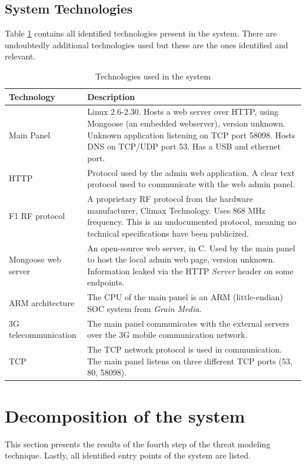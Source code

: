 \subsection{System Technologies}
Table \ref{tb:system-technologies} contains all identified technologies present in the system. There are undoubtedly additional technologies used but these are the ones identified and relevant.
\begin{table}[!p]
    \centering
    \begin{tabularx}{\textwidth}{l X}
        \hline
        \textbf{Technology}  & \textbf{Description}
        \\ \hline
        Main Panel & Linux 2.6-2.30. Hosts a web server over HTTP, using Mongoose (an embedded webserver), version unknown. Unknown application listening on TCP port 58098. Hosts DNS on TCP/UDP port 53. Has a USB and ethernet port.
        \\ \hline
        HTTP  & Protocol used by the admin web application. A clear text protocol used to communicate with the web admin panel.
        \\ \hline
        F1 RF protocol  & A proprietary \gls{RF} protocol from the hardware manufacturer, Climax Technology. Uses 868 MHz frequency. This is an undocumented protocol, meaning no technical specifications have been publicized.
        \\ \hline
        Mongoose web server  & An open-source web server, in C. Used by the main panel to host the local admin web page, version unknown. Information leaked via the HTTP \textit{Server} header on some endpoints.
        \\ \hline
        ARM architecture  & The CPU of the main panel is an ARM (little-endian) SOC system from \textit{Grain Media}.
        \\ \hline
        3G telecommunication  & The main panel communicates with the external servers over the 3G mobile communication network.
        \\ \hline
        TCP  & The \gls{TCP} network protocol is used in communication. The main panel listens on three different TCP ports (53, 80, 58098).
        \\ \hline
    \end{tabularx}
    \caption{Technologies used in the system}
    \label{tb:system-technologies}
\end{table}

\section{Decomposition of the system}
This section presents the results of the fourth step of the threat modeling technique. Lastly, all identified entry points of the system are listed.

